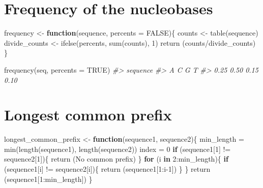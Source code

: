 \documentclass[
]{book}
\newenvironment{Shaded}{\begin{snugshade}}{\end{snugshade}}
\newcommand{\AttributeTok}[1]{\textcolor[rgb]{0.77,0.63,0.00}{#1}}
\newcommand{\CommentTok}[1]{\textcolor[rgb]{0.56,0.35,0.01}{\textit{#1}}}
\newcommand{\ConstantTok}[1]{\textcolor[rgb]{0.00,0.00,0.00}{#1}}
\newcommand{\ControlFlowTok}[1]{\textcolor[rgb]{0.13,0.29,0.53}{\textbf{#1}}}
\newcommand{\DecValTok}[1]{\textcolor[rgb]{0.00,0.00,0.81}{#1}}
\newcommand{\FunctionTok}[1]{\textcolor[rgb]{0.00,0.00,0.00}{#1}}
\newcommand{\NormalTok}[1]{#1}
\newcommand{\OtherTok}[1]{\textcolor[rgb]{0.56,0.35,0.01}{#1}}
\newcommand{\SpecialCharTok}[1]{\textcolor[rgb]{0.00,0.00,0.00}{#1}}
\newcommand{\StringTok}[1]{\textcolor[rgb]{0.31,0.60,0.02}{#1}}
\begin{document}
\hypertarget{frequency-of-the-nucleobases}{%
\section{Frequency of the nucleobases}\label{frequency-of-the-nucleobases}}

\begin{Shaded}
\begin{Highlighting}[]
\NormalTok{frequency }\OtherTok{\textless{}{-}} \ControlFlowTok{function}\NormalTok{(sequence, }\AttributeTok{percents =} \ConstantTok{FALSE}\NormalTok{)\{}
\NormalTok{  counts }\OtherTok{\textless{}{-}} \FunctionTok{table}\NormalTok{(sequence)}
\NormalTok{  divide\_counts }\OtherTok{\textless{}{-}} \FunctionTok{ifelse}\NormalTok{(percents, }\FunctionTok{sum}\NormalTok{(counts), }\DecValTok{1}\NormalTok{)}
  \FunctionTok{return}\NormalTok{ (counts}\SpecialCharTok{/}\NormalTok{divide\_counts)}
\NormalTok{\}}
\end{Highlighting}
\end{Shaded}

\begin{Shaded}
\begin{Highlighting}[]
\FunctionTok{frequency}\NormalTok{(seq, }\AttributeTok{percents =} \ConstantTok{TRUE}\NormalTok{)}
\CommentTok{\#\textgreater{} sequence}
\CommentTok{\#\textgreater{}    A    C    G    T }
\CommentTok{\#\textgreater{} 0.25 0.50 0.15 0.10}
\end{Highlighting}
\end{Shaded}

\hypertarget{longest-common-prefix}{%
\section{Longest common prefix}\label{longest-common-prefix}}

\begin{Shaded}
\begin{Highlighting}[]
\NormalTok{longest\_common\_prefix }\OtherTok{\textless{}{-}} \ControlFlowTok{function}\NormalTok{(sequence1, sequence2)\{}
\NormalTok{  min\_length }\OtherTok{=} \FunctionTok{min}\NormalTok{(}\FunctionTok{length}\NormalTok{(sequence1), }\FunctionTok{length}\NormalTok{(sequence2))}
\NormalTok{  index }\OtherTok{=} \DecValTok{0}
  \ControlFlowTok{if}\NormalTok{ (sequence1[}\DecValTok{1}\NormalTok{] }\SpecialCharTok{!=}\NormalTok{ sequence2[}\DecValTok{1}\NormalTok{])\{}
    \FunctionTok{return}\NormalTok{ (}\StringTok{\textquotesingle{}No common prefix\textquotesingle{}}\NormalTok{)}
\NormalTok{  \}}
  \ControlFlowTok{for}\NormalTok{ (i }\ControlFlowTok{in} \DecValTok{2}\SpecialCharTok{:}\NormalTok{min\_length)\{}
    \ControlFlowTok{if}\NormalTok{ (sequence1[i] }\SpecialCharTok{!=}\NormalTok{ sequence2[i])\{}
      \FunctionTok{return}\NormalTok{ (sequence1[}\DecValTok{1}\SpecialCharTok{:}\NormalTok{i}\DecValTok{{-}1}\NormalTok{])}
\NormalTok{    \}}
\NormalTok{  \}}
  \FunctionTok{return}\NormalTok{ (sequence1[}\DecValTok{1}\SpecialCharTok{:}\NormalTok{min\_length])}
\NormalTok{\}}
\end{Highlighting}
\end{Shaded}
\end{document}
